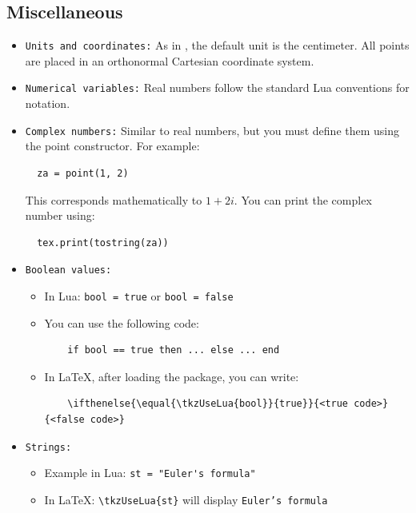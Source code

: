 \subsection{Miscellaneous}
\label{sub:miscellanous}
\begin{itemize}
  \item \texttt{Units and coordinates:} As in , the default unit is the centimeter. All points are placed in an orthonormal Cartesian coordinate system.

  \item \texttt{Numerical variables:} Real numbers follow the standard Lua conventions for notation.

  \item \texttt{Complex numbers:} Similar to real numbers, but you must define them using the point constructor. For example:
  \begin{verbatim}
  za = point(1, 2)
  \end{verbatim}
  This corresponds mathematically to \(1 + 2i\). You can print the complex number using:
  \begin{verbatim}
  tex.print(tostring(za))
  \end{verbatim}

  \item \texttt{Boolean values:}
  \begin{itemize}
    \item In Lua: \verb|bool = true| or \verb|bool = false|
    \item You can use the following  code:
    \begin{verbatim}
    if bool == true then ... else ... end
    \end{verbatim}
    \item In LaTeX, after loading the  package, you can write:
    \begin{verbatim}
    \ifthenelse{\equal{\tkzUseLua{bool}}{true}}{<true code>}{<false code>}
    \end{verbatim}
  \end{itemize}

  \item \texttt{Strings:}
  \begin{itemize}
    \item Example in Lua: \verb|st = "Euler's formula"|
    \item In LaTeX: \verb|\tkzUseLua{st}| will display \texttt{Euler's formula}
  \end{itemize}
\end{itemize}
\endinput